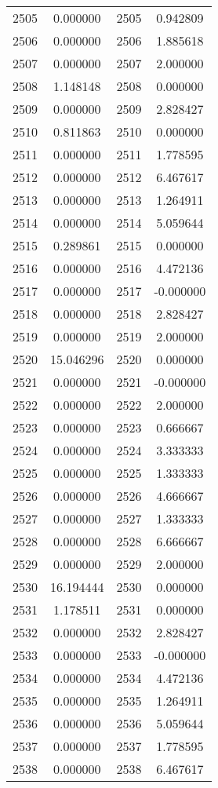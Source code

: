 \documentclass[12pt]{article}
\begin{document}
\begin{longtable}{@{}cccc@{}}
2505 & 0.000000 & 2505 & 0.942809 \\
2506 & 0.000000 & 2506 & 1.885618 \\
2507 & 0.000000 & 2507 & 2.000000 \\
2508 & 1.148148 & 2508 & 0.000000 \\
2509 & 0.000000 & 2509 & 2.828427 \\
2510 & 0.811863 & 2510 & 0.000000 \\
2511 & 0.000000 & 2511 & 1.778595 \\
2512 & 0.000000 & 2512 & 6.467617 \\
2513 & 0.000000 & 2513 & 1.264911 \\
2514 & 0.000000 & 2514 & 5.059644 \\
2515 & 0.289861 & 2515 & 0.000000 \\
2516 & 0.000000 & 2516 & 4.472136 \\
2517 & 0.000000 & 2517 & -0.000000 \\
2518 & 0.000000 & 2518 & 2.828427 \\
2519 & 0.000000 & 2519 & 2.000000 \\
2520 & 15.046296 & 2520 & 0.000000 \\
2521 & 0.000000 & 2521 & -0.000000 \\
2522 & 0.000000 & 2522 & 2.000000 \\
2523 & 0.000000 & 2523 & 0.666667 \\
2524 & 0.000000 & 2524 & 3.333333 \\
2525 & 0.000000 & 2525 & 1.333333 \\
2526 & 0.000000 & 2526 & 4.666667 \\
2527 & 0.000000 & 2527 & 1.333333 \\
2528 & 0.000000 & 2528 & 6.666667 \\
2529 & 0.000000 & 2529 & 2.000000 \\
2530 & 16.194444 & 2530 & 0.000000 \\
2531 & 1.178511 & 2531 & 0.000000 \\
2532 & 0.000000 & 2532 & 2.828427 \\
2533 & 0.000000 & 2533 & -0.000000 \\
2534 & 0.000000 & 2534 & 4.472136 \\
2535 & 0.000000 & 2535 & 1.264911 \\
2536 & 0.000000 & 2536 & 5.059644 \\
2537 & 0.000000 & 2537 & 1.778595 \\
2538 & 0.000000 & 2538 & 6.467617 \\

\end{longtable}
\end{document}
